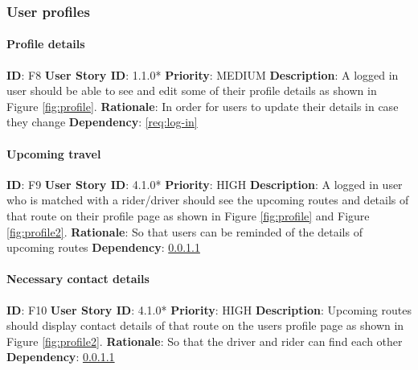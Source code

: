 \documentclass{article}
\begin{document}
\subsubsection{User profiles}

\paragraph{Profile details}\label{req:profileDetails}
\textbf{ID}: F8\newline
\textbf{User Story ID}: 1.1.0*\newline
\textbf{Priority}: MEDIUM\newline
\textbf{Description}: A logged in user should be able to see and edit some of their profile details as shown in Figure \ref{fig:profile}. \newline
\textbf{Rationale}: In order for users to update their details in case they change\newline
\textbf{Dependency}: \ref{req:log-in}\newline

\paragraph{Upcoming travel}\label{req:upcomingTravel}
\textbf{ID}: F9\newline
\textbf{User Story ID}: 4.1.0*\newline
\textbf{Priority}: HIGH\newline
\textbf{Description}: A logged in user who is matched with a rider/driver should see the upcoming routes and details of that route on their profile page as shown in Figure \ref{fig:profile} and Figure \ref{fig:profile2}. \newline
\textbf{Rationale}: So that users can be reminded of the details of upcoming routes\newline
\textbf{Dependency}: \ref{req:profileDetails}\newline

\paragraph{Necessary contact details}\label{req:contactDetails}
\textbf{ID}: F10\newline
\textbf{User Story ID}: 4.1.0*\newline
\textbf{Priority}: HIGH\newline
\textbf{Description}: Upcoming routes should display contact details of that route on the users profile page as shown in Figure \ref{fig:profile2}. \newline
\textbf{Rationale}: So that the driver and rider can find each other\newline
\textbf{Dependency}: \ref{req:profileDetails}\newline
\end{document}
